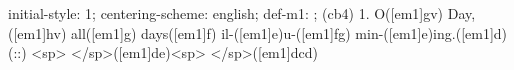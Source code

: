 initial-style: 1;
centering-scheme: english;
def-m1: \grealign;
(cb4) 1. O([em1]gv) Day,([em1]hv) all([em1]g) days([em1]f) il-([em1]e)u-([em1]fg) min-([em1]e)ing.([em1]d) (::) <sp> </sp>([em1]de)<sp> </sp>([em1]dcd)